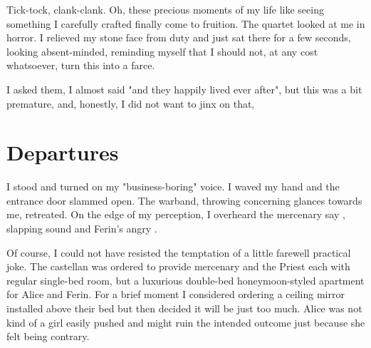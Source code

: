 Tick-tock, clank-clank. Oh, these precious moments of my life like seeing something I carefully crafted finally come to fruition. The quartet looked at me in horror. I relieved my stone face from duty and just sat there for a few seconds, looking absent-minded, reminding myself that I should not, at any cost whatsoever, turn this into a farce.

 I asked them,  I almost said "and they happily lived ever after", but this was a bit premature, and, honestly, I did not want to jinx on that, 

\section{Departures}

I stood and turned on my "business-boring" voice.  I waved my hand and the entrance door slammed open. The warband, throwing concerning glances towards me, retreated. On the edge of my perception, I overheard the mercenary say , slapping sound and Ferin's angry .

Of course, I could not have resisted the temptation of a little farewell practical joke. The castellan was ordered to provide mercenary and the Priest each with regular single-bed room, but a luxurious double-bed honeymoon-styled apartment for Alice and Ferin. For a brief moment I considered ordering a ceiling mirror installed above their bed but then decided it will be just too much. Alice was not kind of a girl easily pushed and might ruin the intended outcome just because she felt being contrary.

